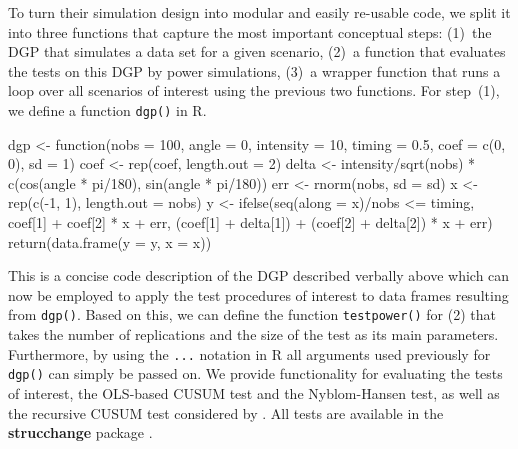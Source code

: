 \documentclass[10pt,a4paper,twoside]{article}
\let\code=\texttt
\let\pkg=\textbf
\let\proglang=\textsf
\newenvironment{Schunk}{}{}
\begin{document}
To turn their simulation design into modular and easily re-usable code, we split it into
three functions that capture the most important conceptual steps: (1)~the DGP that simulates
a data set for a given scenario, (2)~a function that evaluates the tests on this DGP by
power simulations, (3)~a wrapper function that runs a loop over all scenarios of interest
using the previous two functions. For step~(1), we define a function \code{dgp()} in
\proglang{R}.


\begin{Schunk}
\begin{Sinput}
   dgp <- function(nobs = 100, angle = 0, intensity = 10, timing = 0.5,
     coef = c(0, 0), sd = 1)
   {
     coef <- rep(coef, length.out = 2)
     delta <- intensity/sqrt(nobs) * c(cos(angle * pi/180), sin(angle * pi/180))
     err <- rnorm(nobs, sd = sd)
     x <- rep(c(-1, 1), length.out = nobs)
     y <- ifelse(seq(along = x)/nobs <= timing,
            coef[1] + coef[2] * x + err,
   	 (coef[1] + delta[1]) + (coef[2] + delta[2]) * x + err)
     return(data.frame(y = y, x = x))
   }
\end{Sinput}
\end{Schunk}

This is a concise code description of the DGP described verbally above which can
now be employed to apply the test procedures of interest to data frames resulting
from \code{dgp()}.
Based on this, we can define the function \code{testpower()} for (2) that takes the 
number of replications and the size of the test as its main parameters. Furthermore,
by using the \code{...} notation in \proglang{R} all arguments used previously
for \code{dgp()} can simply be passed on. We provide functionality for evaluating
the tests of interest, the OLS-based CUSUM test and the Nyblom-Hansen test, as well
as the recursive CUSUM test considered by \cite{repro:Ploberger+Kraemer:1992}.
All tests are available in the
\pkg{strucchange} package \citep{repro:Zeileis+Leisch+Hornik:2002,repro:Zeileis:2006a}.

\begin{Schunk}
\end{Schunk}
\end{document}
